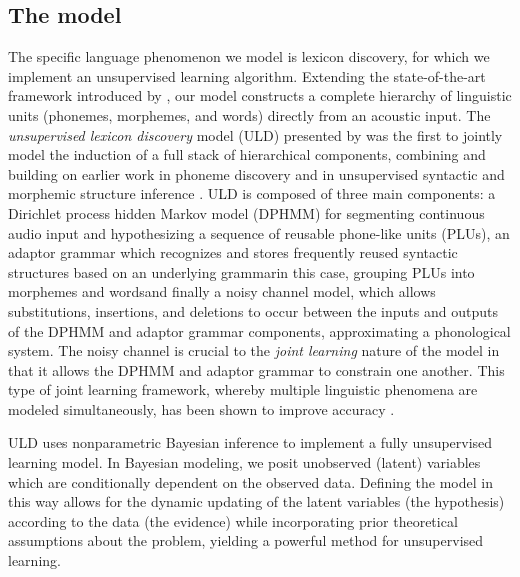 \documentclass[12pt,letterpaper]{article}
\begin{document}
\subsection{The model}
The specific language phenomenon we model is lexicon discovery, for which we implement an unsupervised learning algorithm. Extending the state-of-the-art framework introduced by \citet{lee:2015}, our model constructs a complete hierarchy of linguistic units (phonemes, morphemes, and words) directly from an acoustic input. The \textit{unsupervised lexicon discovery} model (ULD) presented by \citet{lee:2015} was the first to jointly model the induction of a full stack of hierarchical components, combining and building on earlier work in phoneme discovery \citep{lee:2012} and in unsupervised syntactic and morphemic structure inference \citep{johnson:2007, odonnell:2015} . ULD is composed of three main components: a Dirichlet process hidden Markov model (DPHMM) for segmenting continuous audio input and hypothesizing a sequence of reusable phone-like units (PLUs), an adaptor grammar which recognizes and stores frequently reused syntactic structures based on an underlying grammar\textemdash in this case, grouping PLUs into morphemes and words\textemdash and finally a noisy channel model, which allows substitutions, insertions, and deletions to occur between the inputs and outputs of the DPHMM and adaptor grammar components, approximating a phonological system. The noisy channel is crucial to the \textit{joint learning} nature of the model in that it allows the DPHMM and adaptor grammar to constrain one another. This type of joint learning framework, whereby multiple linguistic phenomena are modeled simultaneously, has been shown to improve accuracy \citep{johnson:2008}. 

ULD uses nonparametric Bayesian inference to implement a fully unsupervised learning model. In Bayesian modeling, we posit unobserved (latent) variables which are conditionally dependent on the observed data. Defining the model in this way allows for the dynamic updating of the latent variables (the hypothesis) according to the data (the evidence) while incorporating prior theoretical assumptions about the problem, yielding a powerful method for unsupervised learning. 
\end{document}
